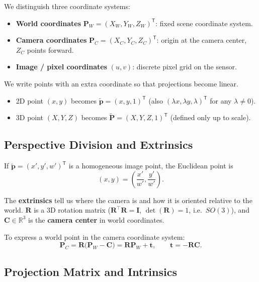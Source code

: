 \documentclass[11pt, oneside]{book}
\newcommand{\R}{\mathbb{R}}
\newcommand{\T}{^{\mathsf{T}}}
\newcommand{\eye}{\mathbf{I}}
\newcommand{\vct}[1]{\bm{#1}}           %
\newcommand{\mat}[1]{\mathbf{#1}}       %
\begin{document}
We distinguish three coordinate systems:
\begin{itemize}
  \item \textbf{World coordinates} $\vct{P}_W=(X_W,Y_W,Z_W)\T$: fixed scene coordinate system.
  \item \textbf{Camera coordinates} $\vct{P}_C=(X_C,Y_C,Z_C)\T$: origin at the camera center, $Z_C$ points forward.
  \item \textbf{Image / pixel coordinates} $(u,v)$: discrete pixel grid on the sensor.
\end{itemize}

\begin{defbox}[title={Homogeneous Coordinates}]
We write points with an extra coordinate so that projections become linear.
\begin{itemize}
  \item 2D point $(x,y)$ becomes $\tilde{\vct{p}}=(x,y,1)\T$ (also $(\lambda x,\lambda y,\lambda)\T$ for any $\lambda\neq 0$).
  \item 3D point $(X,Y,Z)$ becomes $\tilde{\vct{P}}=(X,Y,Z,1)\T$ (defined only up to scale).
\end{itemize}
\end{defbox}

\subsection{Perspective Division and Extrinsics}

\begin{thmbox}[title={Perspective Division}]
If $\tilde{\vct{p}}=(x',y',w')\T$ is a homogeneous image point, the Euclidean point is
\[
(x,y)=\left(\frac{x'}{w'},\frac{y'}{w'}\right).
\]
\end{thmbox}

The \textbf{extrinsics} tell us where the camera is and how it is oriented relative to the world.
$\mat{R}$ is a 3D rotation matrix ($\mat{R}^\top \mat{R}=\eye$, $\det(\mat{R})=1$, i.e.\ $SO(3)$),
and $\vct{C}\in\R^3$ is the \textbf{camera center} in world coordinates.

\begin{thmbox}[title={World to Camera Transform}]
To express a world point in the camera coordinate system:
\[
\vct{P}_C = \mat{R}\bigl(\vct{P}_W - \vct{C}\bigr) = \mat{R}\vct{P}_W + \vct{t},
\qquad
\vct{t} = -\mat{R}\vct{C}.
\]
\end{thmbox}

\subsection{Projection Matrix and Intrinsics}
\end{document}
